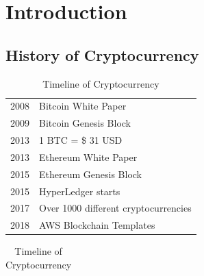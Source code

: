 \section{Introduction}

\subsection[Overview]{History of Cryptocurrency}
\vspace*{-0.5cm}

\begin{minipage}[h]{0.45\linewidth}
\begin{warpprint}
\begin{table}[H]{}
\renewcommand\arraystretch{1.4}
\captionsetup{singlelinecheck=false, labelfont=sc, labelsep=quad}
\caption{Timeline of Cryptocurrency}%
\begin{tabular}{c p{5cm}}%
2008 & Bitcoin White Paper \\
2009 & Bitcoin Genesis Block\\
2013 & 1 BTC = \$ 31 USD\\
2013 & \gls{Ethereum} White Paper \\
2015 & \gls{Ethereum} Genesis Block\\
2015 & \gls{HyperLedger} starts \\
2017 & Over 1000 different cryptocurrencies \\
2018 & AWS Blockchain Templates \\
\end{tabular}
\end{table}
\end{warpprint}
\begin{warpHTML}
\begin{table}[H]{}
\renewcommand\arraystretch{1.4}
\caption{Timeline of Cryptocurrency}%
\begin{tabular}{c p{5cm}}%

\end{tabular}
\end{table}
\end{warpHTML}
\end{minipage}
